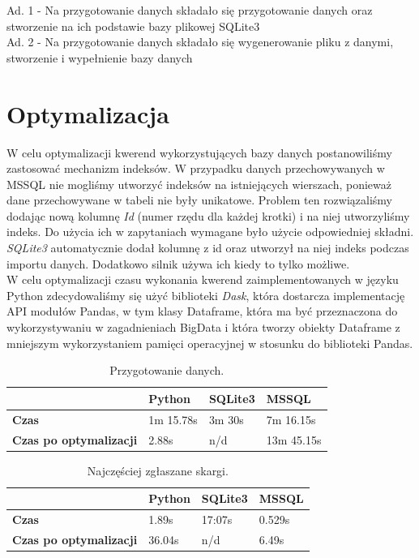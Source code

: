\documentclass{classrep}
\begin{document}
Ad. 1 - Na przygotowanie danych składało się przygotowanie danych oraz stworzenie na ich podstawie bazy plikowej SQLite3 \\

Ad. 2  - Na przygotowanie danych składało się wygenerowanie pliku z danymi, stworzenie i wypełnienie bazy danych
\section{Optymalizacja}

W celu optymalizacji kwerend wykorzystujących bazy danych postanowiliśmy zastosować mechanizm indeksów. W przypadku danych przechowywanych w MSSQL nie mogliśmy utworzyć indeksów na istniejących wierszach, ponieważ dane przechowywane w tabeli nie były unikatowe. Problem ten rozwiązaliśmy dodając nową kolumnę \textit{Id} (numer rzędu dla każdej krotki) i na niej utworzyliśmy indeks. Do użycia ich w zapytaniach wymagane było użycie odpowiedniej składni. \textit{SQLite3} automatycznie dodał kolumnę z id oraz utworzył na niej indeks podczas importu danych. Dodatkowo silnik używa ich kiedy to tylko możliwe.\\

W celu optymalizacji czasu wykonania kwerend zaimplementowanych w języku Python zdecydowaliśmy się użyć biblioteki \textit{Dask}, która dostarcza implementację API modułów Pandas, w tym klasy Dataframe, która ma być przeznaczona do wykorzystywaniu w zagadnieniach BigData i która tworzy obiekty Dataframe z mniejszym wykorzystaniem pamięci operacyjnej w stosunku do biblioteki Pandas.


\begin{table}[H]
\centering
\caption{Przygotowanie danych.}
\label{tab:calc1}
\begin{tabular}{|l|l|l|l|}
\hline
 & \textbf{Python} & \textbf{SQLite3} & \textbf{MSSQL} \\ \hline
\textbf{Czas} & 1m 15.78s & 3m 30s & 7m 16.15s \\ \hline
\textbf{Czas po optymalizacji} & 2.88s & n/d & 13m 45.15s \\ \hline
\end{tabular}
\end{table}

\begin{table}[H]
\centering
\caption{Najczęściej zgłaszane skargi.}
\label{tab:calc2}
\begin{tabular}{|l|l|l|l|}
\hline
 & \textbf{Python} & \textbf{SQLite3} & \textbf{MSSQL} \\ \hline
\textbf{Czas} & 1.89s & 17:07s & 0.529s \\ \hline
\textbf{Czas po optymalizacji} & 36.04s & n/d & 6.49s \\ \hline
\end{tabular}
\end{table}
\end{document}
